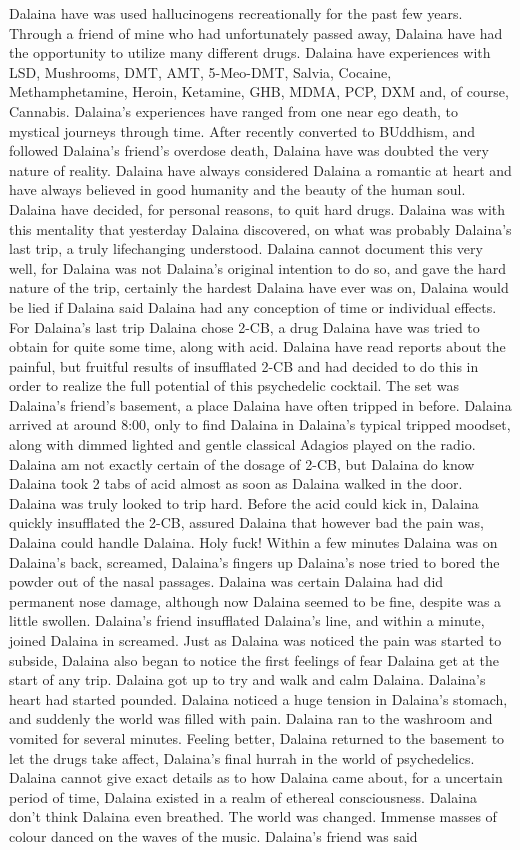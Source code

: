 \documentclass[12pt]{book}
\begin{document}
Dalaina have was used hallucinogens recreationally for the past few years. Through a friend of mine who had unfortunately passed away, Dalaina have had the opportunity to utilize many different drugs. Dalaina have experiences with LSD, Mushrooms, DMT, AMT, 5-Meo-DMT, Salvia, Cocaine, Methamphetamine, Heroin, Ketamine, GHB, MDMA, PCP, DXM and, of course, Cannabis. Dalaina's experiences have ranged from one near ego death, to mystical journeys through time. After recently converted to BUddhism, and followed Dalaina's friend's overdose death, Dalaina have was doubted the very nature of reality. Dalaina have always considered Dalaina a romantic at heart and have always believed in good humanity and the beauty of the human soul. Dalaina have decided, for personal reasons, to quit hard drugs. Dalaina was with this mentality that yesterday Dalaina discovered, on what was probably Dalaina's last trip, a truly lifechanging understood. Dalaina cannot document this very well, for Dalaina was not Dalaina's original intention to do so, and gave the hard nature of the trip, certainly the hardest Dalaina have ever was on, Dalaina would be lied if Dalaina said Dalaina had any conception of time or individual effects. For Dalaina's last trip Dalaina chose 2-CB, a drug Dalaina have was tried to obtain for quite some time, along with acid. Dalaina have read reports about the painful, but fruitful results of insufflated 2-CB and had decided to do this in order to realize the full potential of this psychedelic cocktail. The set was Dalaina's friend's basement, a place Dalaina have often tripped in before. Dalaina arrived at around 8:00, only to find Dalaina in Dalaina's typical tripped moodset, along with dimmed lighted and gentle classical Adagios played on the radio. Dalaina am not exactly certain of the dosage of 2-CB, but Dalaina do know Dalaina took 2 tabs of acid almost as soon as Dalaina walked in the door. Dalaina was truly looked to trip hard. Before the acid could kick in, Dalaina quickly insufflated the 2-CB, assured Dalaina that however bad the pain was, Dalaina could handle Dalaina. Holy fuck! Within a few minutes Dalaina was on Dalaina's back, screamed, Dalaina's fingers up Dalaina's nose tried to bored the powder out of the nasal passages. Dalaina was certain Dalaina had did permanent nose damage, although now Dalaina seemed to be fine, despite was a little swollen. Dalaina's friend insufflated Dalaina's line, and within a minute, joined Dalaina in screamed. Just as Dalaina was noticed the pain was started to subside, Dalaina also began to notice the first feelings of fear Dalaina get at the start of any trip. Dalaina got up to try and walk and calm Dalaina. Dalaina's heart had started pounded. Dalaina noticed a huge tension in Dalaina's stomach, and suddenly the world was filled with pain. Dalaina ran to the washroom and vomited for several minutes. Feeling better, Dalaina returned to the basement to let the drugs take affect, Dalaina's final hurrah in the world of psychedelics. Dalaina cannot give exact details as to how Dalaina came about, for a uncertain period of time, Dalaina existed in a realm of ethereal consciousness. Dalaina don't think Dalaina even breathed. The world was changed. Immense masses of colour danced on the waves of the music. Dalaina's friend was said 
\end{document}
